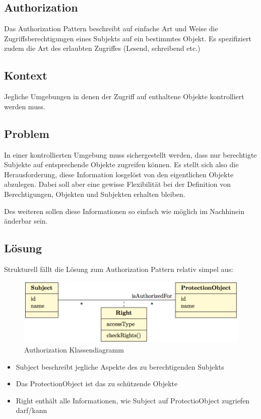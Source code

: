 \subsection{Authorization}

Das Authorization Pattern beschreibt auf einfache Art und Weise die Zugriffsberechtigungen eines Subjekts auf ein bestimmtes Objekt. Es spezifiziert zudem die Art des erlaubten Zugriffes (Lesend, schreibend etc.)

\subsection*{Kontext}
Jegliche Umgebungen in denen der Zugriff auf enthaltene Objekte kontrolliert werden muss.

\subsection*{Problem}
In einer kontrollierten Umgebung muss sichergestellt werden, dass nur berechtigte Subjekte auf entsprechende Objekte zugreifen können. Es stellt sich also die Herausforderung, diese Information losgelöst von den eigentlichen Objekte abzulegen. Dabei soll aber eine gewisse Flexibilität bei der Definition von Berechtigungen, Objekten und Subjekten erhalten bleiben.

Des weiteren sollen diese Informationen so einfach wie möglich im Nachhinein änderbar sein.

\subsection*{Lösung}
Strukturell fällt die Lösung zum Authorization Pattern relativ simpel aus:

\begin{figure}[H]
	\includegraphics[width=\textwidth]{content/security/accesscontrolmodels/images/authorization.png}
\caption{Authorization Klassendiagramm}
\end{figure}

\begin{itemize}
	\item Subject beschreibt jegliche Aspekte des zu berechtigenden Subjekts
	\item Das ProtectionObject ist das zu schützende Objekte
	\item Right enthält alle Informationen, wie Subject auf ProtectioObject zugriefen darf/kann
\end{itemize}


